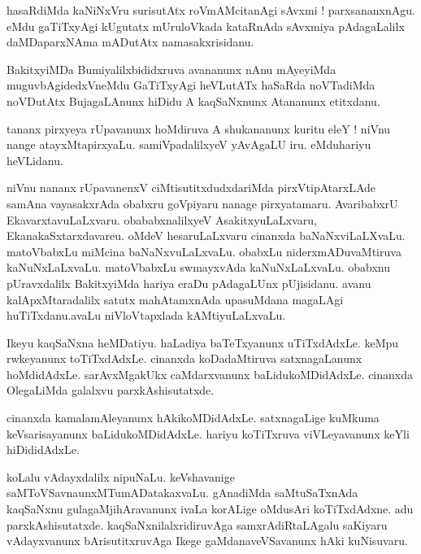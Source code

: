 \documentclass{article}
\begin{document}
\begin{mn}%
hasaRdiMda kaNiNxVru surisutAtx roVmAMcitanAgi sAvxmi ! parxsananxnAgu. eMdu gaTiTxyAgi 
kUgutatx mUruloVkada kataRnAda sAvxmiya pAdagaLalilx daMDaparxNAma mADutAtx namasakxrisidanu.
\end{mn}

\begin{mn}%
BakitxyiMDa Bumiyalilxbididxruva avananunx nAnu mAyeyiMda muguvbAgidedxVneMdu GaTiTxyAgi 
heVLutATx haSaRda noVTadiMda noVDutAtx BujagaLAnunx hiDidu A kaqSaNxnunx Atananunx etitxdanu.
\end{mn}

\begin{mn}%
tananx pirxyeya rUpavanunx hoMdiruva A shukananunx kuritu eleY ! niVnu nange 
atayxMtapirxyaLu. samiVpadalilxyeV yAvAgaLU iru. eMduhariyu heVLidanu.
\end{mn}

\begin{mn}%
niVnu nananx rUpavanenxV ciMtisutitxdudxdariMda pirxVtipAtarxLAde samAna vayasakxrAda 
obabxru goVpiyaru nanage pirxyatamaru. AvaribabxrU EkavarxtavuLaLxvaru. obababxnalilxyeV 
AsakitxyuLaLxvaru, EkanakaSxtarxdavareu. oMdeV hesaruLaLxvaru cinanxda baNaNxviLaLXvaLu. 
matoVbabxLu miMcina baNaNxvuLaLxvaLu. obabxLu niderxmADuvaMtiruva kaNuNxLaLxvaLu. 
matoVbabxLu swmayxvAda kaNuNxLaLxvaLu. obabxnu pUravxdalilx BakitxyiMda hariya eraDu
pAdagaLUnx pUjisidanu. avanu kalApxMtaradalilx satutx mahAtamxnAda upasuMdana magaLAgi 
huTiTxdanu.avaLu niVloVtapxlada kAMtiyuLaLxvaLu.
\end{mn}

\begin{mn}%
Ikeyu kaqSaNxna heMDatiyu. haLadiya baTeTxyanunx uTiTxdAdxLe. keMpu rwkeyanunx 
toTiTxdAdxLe. cinanxda koDadaMtiruva satxnagaLanunx hoMdidAdxLe. sarAvxMgakUkx 
caMdarxvanunx baLidukoMDidAdxLe. cinanxda OlegaLiMda galalxvu parxkAshisutatxde.
\end{mn}

\begin{mn}%
cinanxda kamalamAleyanunx hAkikoMDidAdxLe. satxnagaLige kuMkuma keVsarisayanunx 
baLidukoMDidAdxLe. hariyu koTiTxruva viVLeyavanunx keYli hiDididAdxLe.
\end{mn}

\begin{mn}%
koLalu vAdayxdalilx nipuNaLu. keVshavanige saMToVSavnaunxMTumADatakaxvaLu. gAnadiMda 
saMtuSaTxnAda kaqSaNxnu gulagaMjihAravanunx ivaLa korALige oMdusAri koTiTxdAdxne. adu 
parxkAshisutatxde. kaqSaNxnilalxridiruvAga samxrAdiRtaLAgalu saKiyaru vAdayxvanunx 
bArisutitxruvAga Ikege gaMdanaveVSavanunx hAki kuNisuvaru.
\end{mn}
\end{document}

